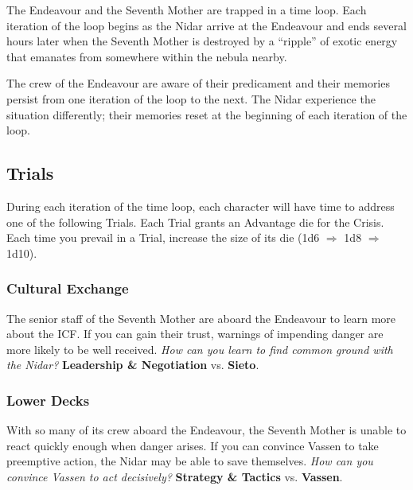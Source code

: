 \documentclass[11pt, a5paper, parskip=half-, DIV=12]{scrartcl}
\begin{document}
The Endeavour and the Seventh Mother are trapped in a time loop. Each iteration of the loop begins as the Nidar arrive at the Endeavour and ends several hours later when the Seventh Mother is destroyed by a ``ripple'' of exotic energy
that emanates from somewhere within the nebula nearby.

The crew of the Endeavour are aware of their predicament and their memories persist from one iteration of the loop to the next.  The Nidar experience the situation differently; their memories reset at the beginning of each iteration of the loop.


\newpage

\subsection*{Trials}
During each iteration of the time loop, each character will have time to address one of the following Trials.
Each Trial grants an Advantage die for the Crisis. Each time you prevail in a Trial, increase the size of its die (1d6 $\Longrightarrow$ 1d8 $\Longrightarrow$ 1d10). 

\subsubsection*{Cultural Exchange}
The senior staff of the Seventh Mother
are aboard the Endeavour to learn more about the ICF.
If you can gain their trust, warnings of impending danger are more likely to be well received. \textit{How can you learn to find common ground with the Nidar?} \textbf{Leadership \& Negotiation} vs. \textbf{Sieto}.

\subsubsection*{Lower Decks}
With so many of its crew aboard the Endeavour, the Seventh Mother is unable to react quickly enough when danger arises. If you can convince Vassen to take preemptive action, the Nidar may be able to save themselves. \textit{How can you convince Vassen to act decisively?} \textbf{Strategy \& Tactics} vs. \textbf{Vassen}.
\end{document}
